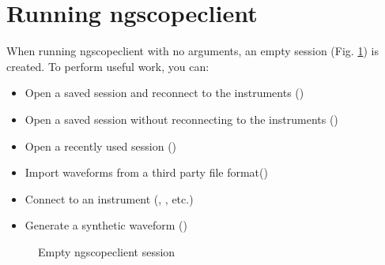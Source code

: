 \section{Running ngscopeclient}

When running ngscopeclient with no arguments, an empty session (Fig. \ref{empty-window}) is created. To perform useful
work, you can:
\begin{itemize}
\item Open a saved session and reconnect to the instruments ()
\item Open a saved session without reconnecting to the instruments ()
\item Open a recently used session ()
\item Import waveforms from a third party file format()
\item Connect to an instrument (, , etc.)
\item Generate a synthetic waveform ()
\end{itemize}

\begin{figure}[h]
\centering
\caption{Empty ngscopeclient session}
\label{empty-window}
\end{figure}

\begin{comment}

\subsection{Configuration arguments}

Most of these arguments are intended for developers, but they can help troubleshoot unusual bugs.

\begin{itemize}

\item \texttt{-{}-noavx2}\\
Do not use AVX2 vector optimizations even if the CPU supports it.

\item \texttt{-{}-noavx512f}\\
Do not use AVX512F vector optimizations even if the CPU supports it.

\item \texttt{-{}-noglint64}\\
Do not use \texttt{GL\_ARB\_gpu\_shader\_int64} even if the GPU supports it.

\item \texttt{-{}-nogpufilter}\\
Do not use Vulkan (GPU accelerated) implementations of filter blocks, revert to software fallback.

\end{itemize}

\end{comment}

